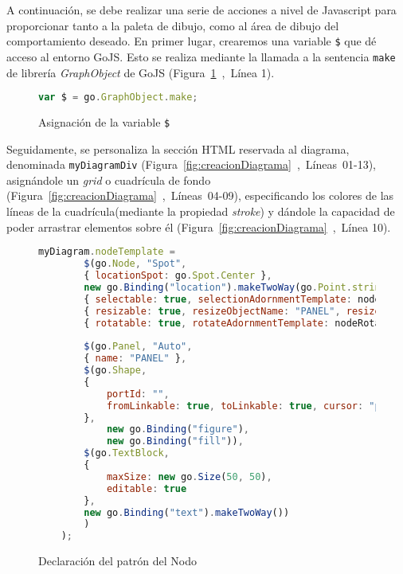 A continuación, se debe realizar una serie de acciones a nivel de Javascript para proporcionar tanto a la paleta de dibujo, como al área de dibujo del comportamiento deseado. En primer lugar, crearemos una variable \texttt{\$} que dé acceso al entorno GoJS. Esto se realiza mediante la llamada a la sentencia \texttt{make} de librería \emph{GraphObject} de GoJS (Figura~\ref{fig:asignacionDollar}~,~Línea 1).

\begin{figure}[!tb]
	\centering
	\begin{lstlisting}[language=JavaScript]
	var $ = go.GraphObject.make;
	\end{lstlisting}
	\caption{Asignación de la variable \texttt{\$}}
	\label{fig:asignacionDollar}
\end{figure}

Seguidamente, se personaliza la sección HTML reservada al diagrama, denominada \texttt{myDiagramDiv} (Figura~\ref{fig:creacionDiagrama}~,~Líneas~01-13), asignándole un \emph{grid} o cuadrícula de fondo (Figura~\ref{fig:creacionDiagrama}~,~Líneas~04-09), especificando los colores de las líneas de la cuadrícula(mediante la propiedad \emph{stroke})  y dándole la capacidad de poder arrastrar elementos sobre él (Figura~\ref{fig:creacionDiagrama}~,~Línea 10).

\begin{figure}[!tb]
	\centering
	\begin{lstlisting}[language=JavaScript]
	myDiagram.nodeTemplate =
		$(go.Node, "Spot",
		{ locationSpot: go.Spot.Center },
		new go.Binding("location").makeTwoWay(go.Point.stringify),
		{ selectable: true, selectionAdornmentTemplate: nodeSelectionAdornmentTemplate },
		{ resizable: true, resizeObjectName: "PANEL", resizeAdornmentTemplate: nodeResizeAdornmentTemplate },
		{ rotatable: true, rotateAdornmentTemplate: nodeRotateAdornmentTemplate },
	
		$(go.Panel, "Auto",
		{ name: "PANEL" },
		$(go.Shape,  
		{
			portId: "", 
			fromLinkable: true, toLinkable: true, cursor: "pointer",
		},
			new go.Binding("figure"),
			new go.Binding("fill")),
		$(go.TextBlock,
		{
			maxSize: new go.Size(50, 50),
			editable: true
		},
		new go.Binding("text").makeTwoWay())
		)
	);
	\end{lstlisting}
\caption{Declaración del patrón del Nodo}
\label{fig:patronNodo}
\end{figure}

